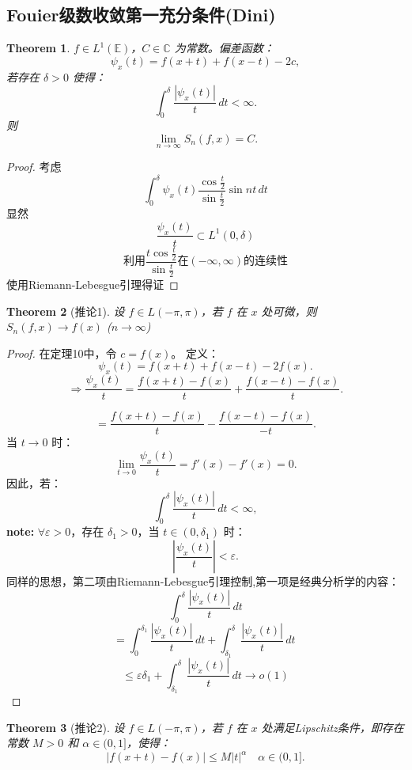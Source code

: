 \documentclass[linespread=1.5,openany]{book}%
\theoremstyle{plain}
\newtheorem{theorem}{Theorem}
\begin{document}
{{{					\subsection{Fouier级数收敛第一充分条件(Dini)}{
						\begin{theorem}\label{3.2.theorem.DINI}
							{$f \in L^1(\mathbb{E})$，$C \in \mathbb{C}$ 为常数。偏差函数：
								\[
								\psi_x(t) = f(x+t) + f(x-t) - 2c,
								\]
								若存在 $\delta > 0$ 使得：
								\[
								\int_0^\delta \frac{|\psi_x(t)|}{t} \, dt < \infty.
								\]
								则\[
								\lim_{n \to \infty} S_n(f, x) = C.
								\]}
						\end{theorem}
						\begin{proof}
							{考虑$$\int_0^\delta \psi_x(t)  \frac{\cos \frac{t}{2}}{\sin \frac{t}{2}} \sin nt \, dt$$
								显然$$\frac{\psi_x(t)}{t} \subset {L^1(0,\delta)}$$
								\[ \text{利用}\frac{t\cos \frac{t}{2}}{\sin \frac{t}{2}}\text{在} (-\infty,\infty)\text{的连续性}\]
								使用Riemann-Lebesgue引理得证}
						\end{proof}
						\begin{theorem}[推论1]{设 \( f \in L(-\pi, \pi) \)，若 \( f \) 在 \( x \) 处可微，则 \( S_n(f, x) \to f(x) \) (\( n \to \infty \))}
						\end{theorem}
						\begin{proof}{
								在定理10中，令 \( c = f(x) \)。
								定义：\[\psi_x(t) = f(x+t) + f(x-t) - 2f(x).\] 
								\[\Rightarrow\frac{\psi_x(t)}{t} = \frac{f(x+t) - f(x)}{t} + \frac{f(x-t) - f(x)}{ t}.\]
								
								\[= \frac{f(x+t) - f(x)}{t} - \frac{f(x-t) - f(x)}{-t}.\]
								当 \( t \to 0 \) 时：
								\[\lim_{t \to 0} \frac{\psi_x(t)}{t} = f'(x) - f'(x) = 0.\]
								因此，若：\[
								\int_0^\delta \frac{|\psi_x(t)|}{t} \, dt < \infty,\]
								\textbf{note:} \(\forall \varepsilon > 0\)，存在 \(\delta_1 > 0\)，当 \( t \in (0, \delta_1) \) 时：
								\[
								\left| \frac{\psi_x(t)}{t} \right| < \varepsilon.
								\]
								同样的思想，第二项由Riemann-Lebesgue引理控制,第一项是经典分析学的内容：
								\[\int_0^\delta \frac{|\psi_x(t)|}{t} \, dt\]
								\[=\int_0^{\delta_{1}} \frac{|\psi_x(t)|}{t} \, dt+\int_{\delta_{1}}^\delta \frac{|\psi_x(t)|}{t} \, dt\ \]
								\[ \le \varepsilon\delta_{1}+\int_{\delta_{1}}^\delta \frac{|\psi_x(t)|}{t} \, dt \to o(1)\]
						}\end{proof}
						
						\begin{theorem}[推论2]{设 \( f \in L(-\pi, \pi) \)，若 \( f \) 在 \( x \) 处满足Lipschitz条件，即存在常数 \( M > 0 \) 和 \( \alpha \in (0, 1] \)，使得：
								\[
								|f(x+t) - f(x)| \leq M |t|^\alpha \quad  \alpha \in (0, 1].
								\]
								
}
\end{theorem}}}}}
\end{document}
